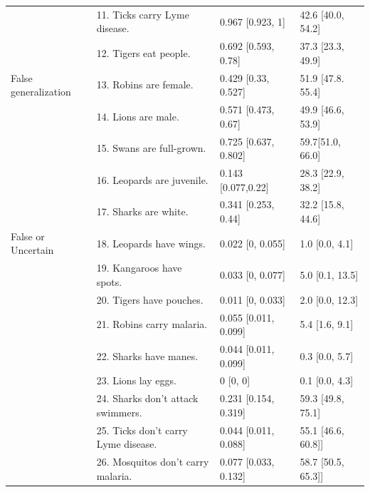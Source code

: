 \documentclass[12pt,letterpaper]{article}
\begin{document}
\begin{table}[h]
\begin{tabular}{| l | l | p{3.5cm} | p{3.5cm} |}
                                  & 11. Ticks carry Lyme disease.                        &0.967	[0.923, 1] &  42.6 [40.0, 54.2]\\
                                  & 12. Tigers eat people.                        &0.692	[0.593, 0.78] & 37.3 [23.3, 49.9]\\
False generalization & 13. Robins are female.      &0.429	[0.33, 0.527] & 51.9 [47.8. 55.4]\\
                                              & 14.  Lions are male.                       &0.571	[0.473, 0.67] & 49.9 [46.6, 53.9]\\
                                         & 15. Swans are full-grown. & 0.725	[0.637, 0.802] & 59.7[51.0, 66.0]\\
                                         & 16. Leopards are juvenile. & 0.143	[0.077,0.22] & 28.3 [22.9, 38.2] \\
                                         & 17. Sharks are white. & 0.341	[0.253, 0.44] & 32.2 [15.8, 44.6] \\
False or Uncertain & 18. Leopards have wings.       &0.022	[0, 0.055]& 1.0 [0.0, 4.1]\\
                                              & 19. Kangaroos have spots.                       & 0.033 [0, 0.077]& 5.0 [0.1, 13.5]\\
                                              & 20.  Tigers have pouches.                       &0.011	[0, 0.033]& 2.0 [0.0, 12.3]\\
                                              & 21.  Robins carry malaria.                       &0.055	[0.011, 0.099]& 5.4 [1.6, 9.1]\\
                                              & 22. Sharks have manes.                       &0.044	[0.011, 0.099]& 0.3 [0.0, 5.7]\\
                                              & 23. Lions lay eggs.                       &0 [0, 0] & 0.1 [0.0, 4.3]\\
                                              & 24. Sharks don't attack swimmers.                       &0.231 [0.154, 0.319] & 59.3 [49.8, 75.1]\\
                                              & 25. Ticks don't carry Lyme disease.                       &0.044 [0.011, 0.088] & 55.1 [46.6, 60.8]]\\
                                              & 26. Mosquitos don't carry malaria.                       &0.077 [0.033, 0.132] & 58.7 [50.5, 65.3]]\\                                              

\end{tabular}
\end{table}
\end{document}
